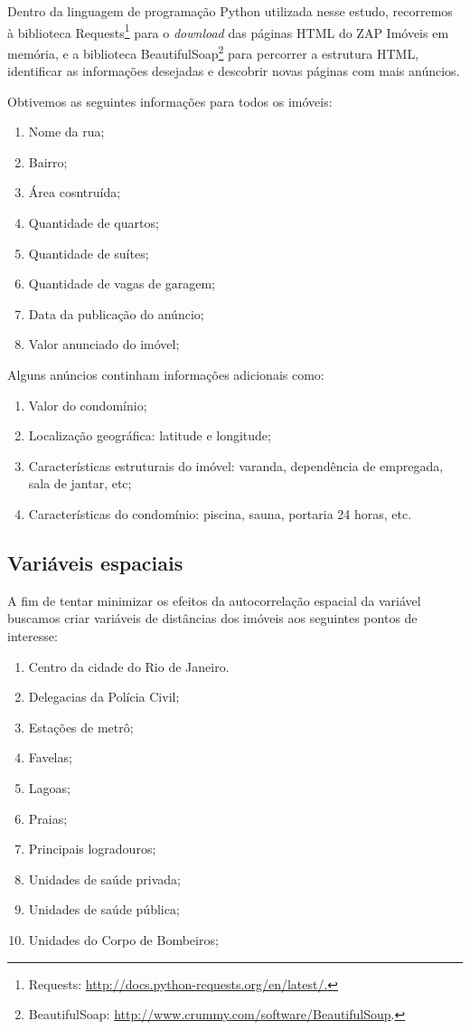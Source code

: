 Dentro da linguagem de programação Python utilizada nesse estudo, recorremos à biblioteca Requests\footnote{Requests: \url{http://docs.python-requests.org/en/latest/.}} para o \textit{download} das páginas HTML do ZAP Imóveis em memória, e a  biblioteca BeautifulSoap\footnote{BeautifulSoap: \url{http://www.crummy.com/software/BeautifulSoup}.} para percorrer a estrutura HTML, identificar as informações desejadas e descobrir novas páginas com mais anúncios.

Obtivemos as seguintes informações para todos os imóveis:

\begin{enumerate}
\item Nome da rua;
\item Bairro;
\item Área cosntruída;
\item Quantidade de quartos;
\item Quantidade de suítes;
\item Quantidade de vagas de garagem;
\item Data da publicação do anúncio;
\item Valor anunciado do imóvel;
\end{enumerate}

Alguns anúncios continham informações adicionais como:
\begin{enumerate}
\item Valor do condomínio;
\item Localização geográfica: latitude e longitude;
\item Características estruturais do imóvel: varanda, dependência de empregada, sala de jantar, etc;
\item Características do condomínio: piscina, sauna, portaria 24 horas, etc.
\end{enumerate}

\subsection{Variáveis espaciais}

A fim de tentar minimizar os efeitos da autocorrelação espacial da variável  buscamos criar variáveis de distâncias dos imóveis aos seguintes pontos de interesse:

\begin{enumerate}\label{list:var_espaciais}
\item Centro da cidade do Rio de Janeiro.
\item Delegacias da Polícia Civil;
\item Estações de metrô;
\item Favelas;
\item Lagoas;
\item Praias;
\item Principais logradouros;
\item Unidades de saúde privada;
\item Unidades de saúde pública;
\item Unidades do Corpo de Bombeiros;
\end{enumerate}

